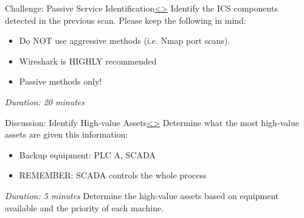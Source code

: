 \documentclass[12pt]{extarticle}
\newenvironment{instructionblock}{\Large\bgroup}{\egroup}
\newcommand{\bi}{\begin{itemize}}
\newcommand{\ei}{\end{itemize}}
\newcounter{next}
\newcounter{prev}
\begin{document}

\pagebreak
{}
\begin{slide}{Challenge: Passive Service Identification}{\hyperref[slide \theprev]{\textless}\hyperref[slide \thenext]{\textgreater}}
	\begin{instructionblock}
		Identify the ICS components detected in the previous scan. Please keep the following in mind:
		\bi
			\item Do NOT use aggressive methods (i.e. Nmap port scans).
			\item Wireshark is HIGHLY recommended
			\item Passive methods only!
		\ei
	\end{instructionblock}
\end{slide}
\textit{Duration: 20 minutes}
\vfill
\noindent
\pagebreak

\pagebreak
{}
\begin{slide}{Discussion: Identify High-value Assets}{\hyperref[slide \theprev]{\textless}\hyperref[slide \thenext]{\textgreater}}
	\begin{instructionblock}
		Determine what the most high-value assets are given this information:
		\bi
			\item Backup equipment: PLC A, SCADA
			\item REMEMBER: SCADA controls the whole process
		\ei 
	\end{instructionblock}
\end{slide}
\textit{Duration: 5 minutes}
\vfill
\noindent
Determine the high-value assets based on equipment available and the priority of each machine.
\pagebreak
\end{document}
